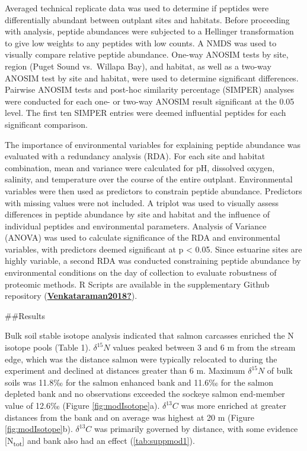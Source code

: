 \documentclass [11pt, proquest] {uwthesis}[2015/03/03]
\begin{document}
Averaged technical replicate data was used to determine if peptides were differentially abundant between outplant sites and habitats. Before proceeding with analysis, peptide abundances were subjected to a Hellinger transformation to give low weights to any peptides with low counts. A NMDS was used to visually compare relative peptide abundance. One-way ANOSIM tests by site, region (Puget Sound vs.~Willapa Bay), and habitat, as well as a two-way ANOSIM test by site and habitat, were used to determine significant differences. Pairwise ANOSIM tests and post-hoc similarity percentage (SIMPER) analyses were conducted for each one- or two-way ANOSIM result significant at the 0.05 level. The first ten SIMPER entries were deemed influential peptides for each significant comparison.

The importance of environmental variables for explaining peptide abundance was evaluated with a redundancy analysis (RDA). For each site and habitat combination, mean and variance were calculated for pH, dissolved oxygen, salinity, and temperature over the course of the entire outplant. Environmental variables were then used as predictors to constrain peptide abundance. Predictors with missing values were not included. A triplot was used to visually assess differences in peptide abundance by site and habitat and the influence of individual peptides and environmental parameters. Analysis of Variance (ANOVA) was used to calculate significance of the RDA and environmental variables, with predictors deemed significant at p \textless{} 0.05. Since estuarine sites are highly variable, a second RDA was conducted constraining peptide abundance by environmental conditions on the day of collection to evaluate robustness of proteomic methods. R Scripts are available in the supplementary Github repository (\protect\hyperlink{ref-Venkataraman2018}{\textbf{Venkataraman2018?}}).

\#\#Results

Bulk soil stable isotope analysis indicated that salmon carcasses enriched the N isotope pools (Table 1). \(\delta^{15}N\) values peaked between 3 and 6 m from the stream edge, which was the distance salmon were typically relocated to during the experiment and declined at distances greater than 6 m. Maximum \(\delta^{15}N\) of bulk soils was 11.8‰ for the salmon enhanced bank and 11.6‰ for the salmon depleted bank and no observations exceeded the sockeye salmon end-member value of 12.6‰ (Figure \ref{fig:modIsotope}a). \(\delta^{13}C\) was more enriched at greater distances from the bank and on average was highest at 20 m (Figure \ref{fig:modIsotope}b). \(\delta^{13}C\) was primarily governed by distance, with some evidence {[}N\textsubscript{tot}{]} and bank also had an effect (\ref{tab:suppmod1}).
\end{document}
